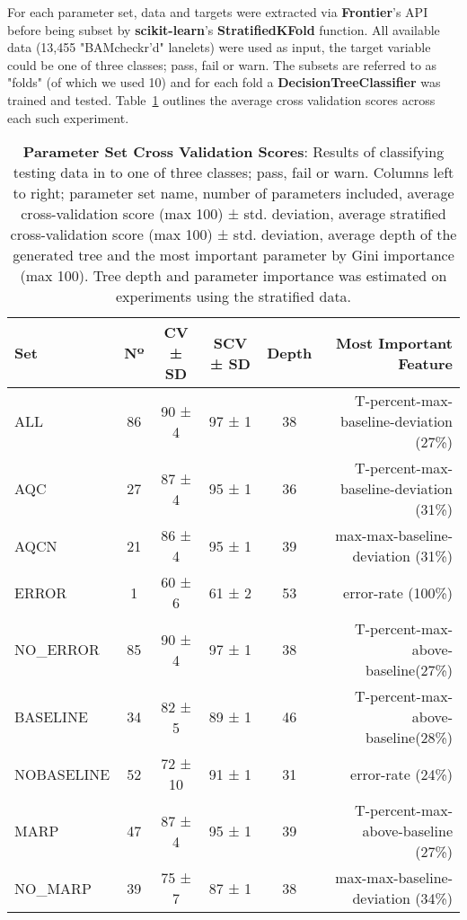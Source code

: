 For each parameter set, data and targets were extracted via \textbf{Frontier}'s
API before being subset by \textbf{scikit-learn}'s \textbf{StratifiedKFold}
function. All available data (13,455 "BAMcheckr'd" lanelets) were used as input,
the target variable could be one of three classes; pass, fail or warn.
The subsets are referred to as "folds" (of which we used 10) and for
each fold a \textbf{DecisionTreeClassifier} was trained and tested.
Table~\ref{tab:pset-cv} outlines the average cross validation scores across each
such experiment.

\begin{table}[H]
    \centering
    \begin{tabular}{l | c  c  c  c  r}
        Set           & Nº & CV ± SD & SCV ± SD & Depth & Most Important Feature\\
        \hline
        ALL           & 86 & 90 ± 4 & 97 ± 1 & 38 & T-percent-max-baseline-deviation (27\%)\\
        AQC           & 27 & 87 ± 4 & 95 ± 1 & 36 & T-percent-max-baseline-deviation (31\%)\\
        AQCN          & 21 & 86 ± 4 & 95 ± 1 & 39 & max-max-baseline-deviation (31\%)\\
        ERROR         & 1  & 60 ± 6 & 61 ± 2 & 53 & error-rate (100\%)\\
        NO\_ERROR     & 85 & 90 ± 4 & 97 ± 1 & 38 & T-percent-max-above-baseline(27\%)\\
        BASELINE      & 34 & 82 ± 5 & 89 ± 1 & 46 & T-percent-max-above-baseline(28\%)\\
        NOBASELINE    & 52 & 72 ± 10 & 91 ± 1 & 31 & error-rate (24\%)\\
        MARP          & 47 & 87 ± 4 & 95 ± 1 & 39 & T-percent-max-above-baseline (27\%)\\
        NO\_MARP      & 39 & 75 ± 7 & 87 ± 1 & 38 & max-max-baseline-deviation (34\%)\\
    \end{tabular}

    \caption[pset-cv]{\textbf{Parameter Set Cross Validation Scores}: Results of
        classifying testing data in to one of three classes; pass, fail or warn.
        Columns left to right; parameter set name, number of parameters
        included, average cross-validation score (max 100) ± std. deviation,
        average stratified cross-validation score (max 100) ± std. deviation,
        average depth of the generated tree and the most important parameter by
        Gini importance (max 100). Tree depth and parameter importance was
    estimated on experiments using the stratified data.}

    \label{tab:pset-cv}
\end{table}

